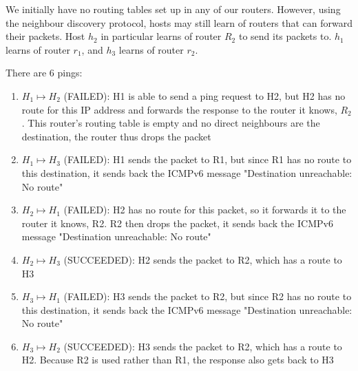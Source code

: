 
We initially have no routing tables set up in any of our routers. However, using the neighbour discovery protocol, hosts may still learn of routers that can forward their packets. Host $h_2$ in particular learns of router $R_2$ to send its packets to. $h_1$ learns of router $r_1$, and $h_3$ learns of router $r_2$.

There are 6 pings:\\

\begin{enumerate}
    \item $H_1 \mapsto H_2$ (FAILED): H1 is able to send a ping request to H2, but H2 has no route for this IP address and forwards the response to the router it knows, $R_2$. This router's routing table is empty and no direct neighbours are the destination, the router thus drops the packet
    \item $H_1 \mapsto H_3$ (FAILED): H1 sends the packet to R1, but since R1 has no route to this destination, it sends back the ICMPv6 message "Destination unreachable: No route"
    \item $H_2 \mapsto H_1$ (FAILED): H2 has no route for this packet, so it forwards it to the router it knows, R2. R2 then drops the packet, it sends back the ICMPv6 message "Destination unreachable: No route"
    \item $H_2 \mapsto H_3$ (SUCCEEDED): H2 sends the packet to R2, which has a route to H3
    \item $H_3 \mapsto H_1$ (FAILED): H3 sends the packet to R2, but since R2 has no route to this destination, it sends back the ICMPv6 message "Destination unreachable: No route"
    \item $H_3 \mapsto H_2$ (SUCCEEDED): H3 sends the packet to R2, which has a route to H2. Because R2 is used rather than R1, the response also gets back to H3
\end{enumerate}